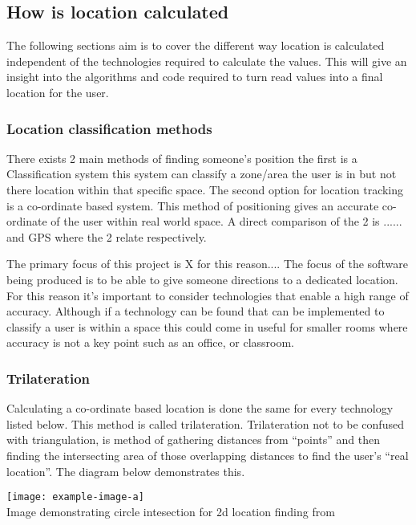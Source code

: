 \subsection{How is location calculated}
The following sections aim is to cover the different way location is calculated independent of the technologies required to calculate the values. This will give an insight into the algorithms and code required to turn read values into a final location for the user. 

\subsubsection{Location classification methods}
There exists 2 main methods of finding someone’s position the first is a Classification system this system can classify a zone/area the user is in but not there location within that specific space. The second option for location tracking is a co-ordinate based system. This method of positioning gives an accurate co-ordinate of the user within real world space. A direct comparison of the 2 is ...... and GPS where the 2 relate respectively.

The primary focus of this project is X for this reason....
The focus of the software being produced is to be able to give someone directions to a dedicated location. For this reason it’s important to consider technologies that enable a high range of accuracy. Although if a technology can be found that can be implemented to classify a user is within a space this could come in useful for smaller rooms where accuracy is not a key point such as an office, or classroom.

\subsubsection{Trilateration}
Calculating a co-ordinate based location is done the same for every technology listed below. This method is called trilateration. Trilateration not to be confused with triangulation, is method of gathering distances from “points” and then finding the intersecting area of those overlapping distances to find the user’s “real location”. The diagram below demonstrates this.
\begin{center}
	\texttt{[image: example-image-a]}\\
	Image demonstrating circle intesection for 2d location finding from \citetemp
\end{center}
